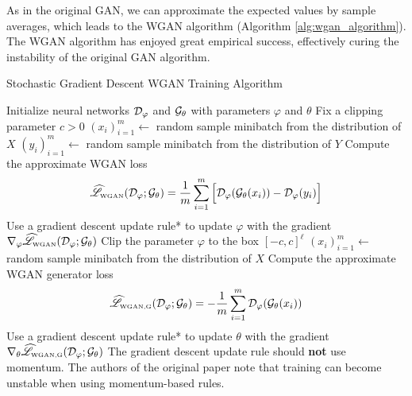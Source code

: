 \documentclass{article}
\begin{document}
	As in the original GAN, we can approximate the expected values by sample averages, which leads to the WGAN algorithm (Algorithm \ref{alg:wgan_algorithm}). The WGAN algorithm has enjoyed great empirical success, effectively curing the instability of the original GAN algorithm.
	
	\newcommand{\approxlosswgan}{\widehat{\mathscr{L}}_{\textnormal{\tiny WGAN}}}
	\newcommand{\approxlosswgangenerator}{\widehat{\mathscr{L}}_{\textnormal{\tiny WGAN,G}}}
	\begin{algorithm}
		\caption{Stochastic Gradient Descent WGAN Training Algorithm}\label{alg:wgan_algorithm}
		\begin{algorithmic}
			\State Initialize neural networks \(\mathcal{D}_\varphi\) and \(\mathcal{G}_\theta\) with parameters \(\varphi\) and \(\theta\)
			\State Fix a clipping parameter \(c > 0\)
					\State \(\left(x_i\right)_{i=1}^m \gets \) random sample minibatch from the distribution of \(X\)
					\State \(\left(y_i\right)_{i=1}^m \gets \) random sample minibatch from the distribution of \(Y\)
					\State Compute the approximate WGAN loss
					\begin{equation*}
						\approxlosswgan(\discriminator_\varphi; \generator_\theta) = \frac{1}{m}\sum_{i=1}^m \Big[\discriminator_\varphi(\generator_{\theta}(x_i)) - \discriminator_\varphi(y_i)\Big]
					\end{equation*}
					\State Use a gradient descent update rule* to update \(\varphi\) with the gradient \(\nabla_\varphi\approxlosswgan(\discriminator_\varphi; \generator_\theta)\)
					\State Clip the parameter \(\varphi\) to the box \([-c, c]^{\ell}\)
				\EndFor
				\State \(\left(x_i\right)_{i=1}^m \gets \) random sample minibatch from the distribution of \(X\)
				\State Compute the approximate WGAN generator loss
				\begin{equation*}
					\approxlosswgangenerator(\discriminator_\varphi; \generator_\theta) = -\frac{1}{m}\sum_{i=1}^m\discriminator_\varphi(\generator_{\theta}(x_i))
				\end{equation*}
				\State Use a gradient descent update rule* to update \(\theta\) with the gradient \(\nabla_\theta\approxlosswgangenerator(\discriminator_\varphi; \generator_\theta)\)
			\EndFor
			\State
			\State * The gradient descent update rule should \textbf{not} use momentum. The authors of the original paper note that training can become unstable when using momentum-based rules.
		\end{algorithmic}
	\end{algorithm}
\end{document}

